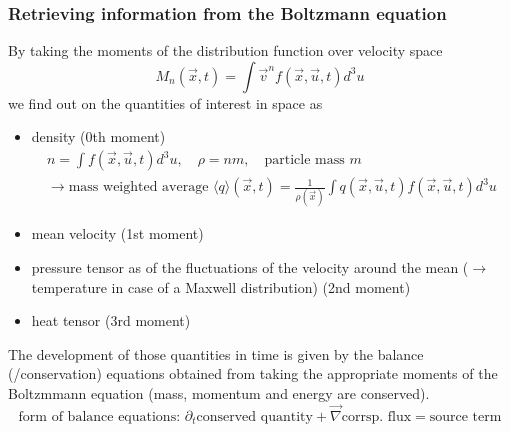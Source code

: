 \subsubsection{Retrieving information from the Boltzmann equation}
By taking the \textcolor{blue1}{moments of the distribution function over velocity space}
\begin{equation}
    M_n(\vec{x},t) = \int \vec{v}^n f(\vec{x},\vec{u},t) d^3u
\end{equation}
we find out on the quantities of interest in space as
\begin{itemize}
    \item \textcolor{blue1}{density} (0th moment)
    \begin{equation}
        \begin{gathered}
            n = \int f(\vec{x},\vec{u},t) d^3u, \quad \rho = nm, \quad \text{particle mass } m \\
            \rightarrow \text{mass weighted average } \langle q \rangle (\vec{x},t) = \frac{1}{\rho(\vec{x})} \int q(\vec{x},\vec{u},t) f(\vec{x},\vec{u},t) d^3u 
        \end{gathered}
    \end{equation}
    \item \textcolor{blue1}{mean velocity} (1st moment)
    \item \textcolor{blue1}{pressure tensor} as of the fluctuations of the velocity around the mean ($\rightarrow$ temperature in case of a Maxwell distribution) (2nd moment)
    \item \textcolor{blue1}{heat tensor} (3rd moment)
\end{itemize}
The development of those quantities in time is given by the \textcolor{blue1}{balance (/conservation) equations obtained from
taking the appropriate moments of the Boltzmmann equation (mass, momentum and energy are conserved)}.
\begin{equation}
    \text{form of balance equations: } \partial_t\text{conserved quantity} + \vec{\nabla}\text{corrsp. flux} = \text{source term} 
\end{equation}

